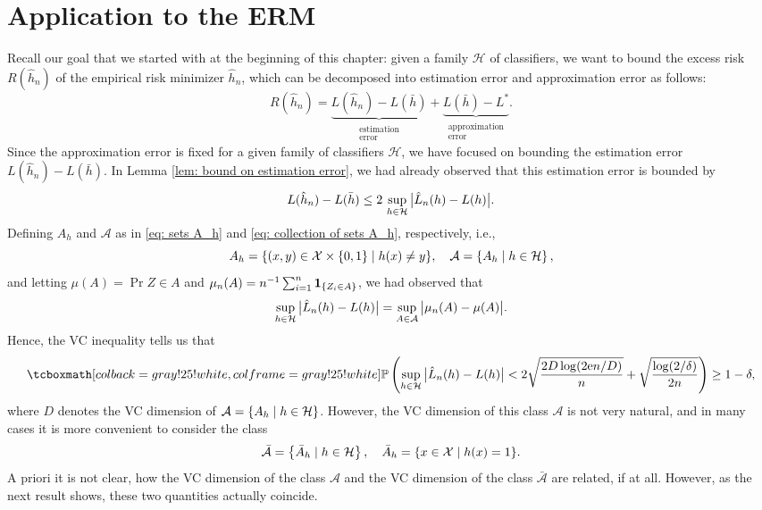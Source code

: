 \section{Application to the ERM}

Recall our goal that we started with at the beginning of this chapter: given a family $\mathcal{H}$ of classifiers, we want to bound the excess risk $R(\hat h_n)$ of the empirical risk minimizer $\hat h_n$, which can be decomposed into estimation error and approximation error as follows:
\[
    R(\hat h_n) = \underbrace{L(\hat h_n) - L(\bar h)}_{\substack{\text{estimation} \\ \text{error}}} + \underbrace{L(\bar h) - L^*}_{\substack{\text{approximation} \\ \text{error}}}.
\]
Since the approximation error is fixed for a given family of classifiers $\mathcal{H}$, we have focused on bounding the estimation error $L(\hat h_n) - L(\bar h)$. In Lemma \ref{lem: bound on estimation error}, we had already observed that this estimation error is bounded by
\[
    L(\hat h_n) - L(\bar h) \leq 2 \, \sup_{h \in \mathcal{H}} \big\lvert \hat L_n(h) - L(h) \big\rvert.
\]
Defining $A_h$ and $\mathcal{A}$ as in \eqref{eq: sets A_h} and \eqref{eq: collection of sets A_h}, respectively, i.e.,
\[
    A_h = \{ (x, y) \in \mathcal{X} \times \left\{0, 1\right\} \mathrel{|} h(x) \neq y \}, \quad \mathcal{A} = \left\{A_h \mathrel{|} h \in \mathcal{H}\right\},
\]
and letting $\mu(A) = \Pr{Z \in A}$ and $\mu_n(A) = n^{-1} \sum_{i=1}^n \mathbf{1}_{\left\{Z_i \in A\right\}}$, we had observed that
\[
    \sup_{h \in \mathcal{H}} \big\lvert \hat L_n(h) - L(h) \big\rvert = \sup_{A \in \mathcal{A}} \big\lvert \mu_n(A) - \mu(A) \big\rvert.
\]
Hence, the VC inequality tells us that
\begin{equation}
\label{eq: VC ineqaulity for ERM}
    \highlightMath{
        \Pr{ \sup_{h \in \mathcal{H}} \bigAbs{ \hat L_n(h) - L(h) } < 2 \sqrt{\frac{2D \log(2 \e n / D)}{n}} + \sqrt{\frac{\log(2 / \delta)}{2n}} } \geq 1 - \delta,
    }
\end{equation}
where $D$ denotes the VC dimension of $\mathcal{A} = \left\{A_h \mathrel{|} h \in \mathcal{H}\right\}$. However, the VC dimension of this class $\mathcal{A}$ is not very natural, and in many cases it is more convenient to consider the class
\begin{equation}
\label{eq: collection of sets bar A_h}
    \bar{\mathcal{A}} = \left\{\bar A_h \mathrel{|} h \in \mathcal{H}\right\}, \quad \bar A_h = \{ x \in \mathcal{X} \mathrel{|} h(x) = 1 \}.
\end{equation}
A priori it is not clear, how the VC dimension of the class $\mathcal{A}$ and the VC dimension of the class $\bar{\mathcal{A}}$ are related, if at all. However, as the next result shows, these two quantities actually coincide.

